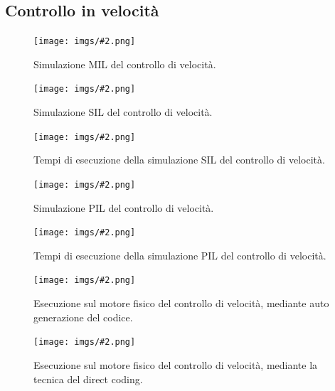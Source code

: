 \documentclass[11pt,a4paper,oneside]{extarticle}
\newcommand\img[3]{
    \begin{figure}[H]\centering
        \texttt{[image: imgs/\#2.png]}
        \caption{#3}
        \label{fig:#2}
    \end{figure}
}
\begin{document}
\subsection{Controllo in velocità}
\img{1}{Speed_State_Feedback_Simulation}{Simulazione MIL del controllo di velocità.}
\newpage
\img{1}{Speed_State_Feedback_SIL_Simulation}{Simulazione SIL del controllo di velocità.}
\img{1}{Speed_State_Feedback_SIL_Code_Profiling}{Tempi di esecuzione della simulazione SIL del controllo di velocità.}
\img{1}{Speed_State_Feedback_PIL_Simulation}{Simulazione PIL del controllo di velocità.}
\img{1}{Speed_State_Feedback_PIL_Code_Profiling}{Tempi di esecuzione della simulazione PIL del controllo di velocità.}
\img{1}{Speed_State_Feedback_Motor_Simulation}{Esecuzione sul motore fisico del controllo di velocità, mediante auto generazione del codice.}
\img{1}{Speed_State_Feedback_Direct_Coding}{Esecuzione sul motore fisico del controllo di velocità, mediante la tecnica del direct coding.}

\newpage
\end{document}
